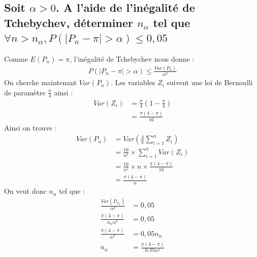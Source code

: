 \documentclass[10pt,a4paper,twoside]{article}
\begin{document}
\subsection{Soit $\alpha > 0$. A l'aide de l'inégalité de Tchebychev, déterminer $n_{\alpha}$ tel que $\forall n>n_{\alpha}, P(|P_{n}-\pi|>\alpha)\leqslant 0,05$}
Comme $E(P_{n})=\pi$, l'inégalité de Tchebychev nous donne :
\begin{align*}
P(|P_{n}-\pi|>\alpha) \leqslant \frac{Var(P_{n})}{\alpha^{2}}
\end{align*}
On cherche maintenant $Var(P_{n})$. Les variables $Z_{i}$ suivent une loi de Bernoulli de paramètre $\frac{\pi}{4}$ ainsi :
\begin{align*}
Var(Z_{i}) &= \frac{\pi}{4}\left(1-\frac{\pi}{4}\right)\\
 &= \frac{\pi(4-\pi)}{16}
\end{align*}
Ainsi on trouve :
\begin{align*}
Var(P_{n}) &= Var(\frac{4}{n}\sum_{i=1}^{n}Z_{i})\\
 &= \frac{16}{n^{2}} \times \sum_{i=1}^{n}Var(Z_{i})\\
 &= \frac{16}{n^{2}} \times n \times \frac{\pi(4-\pi)}{16}\\
 &= \frac{\pi(4-\pi)}{n}
\end{align*}
On veut donc $n_{\alpha}$ tel que :
\begin{align*}
\frac{Var(P_{n_{\alpha}})}{\alpha^{2}} &= 0,05\\
\frac{\pi(4-\pi)}{n_{\alpha}\alpha^{2}} &= 0,05\\
\frac{\pi(4-\pi)}{\alpha^{2}} &= 0,05n_{\alpha}\\
n_{\alpha} &= \frac{\pi(4-\pi)}{0,05\alpha^{2}}
\end{align*}
\end{document}
